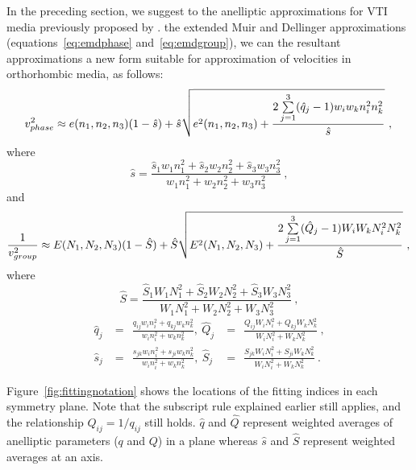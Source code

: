 In the preceding section, we suggest   to the anelliptic approximations for VTI media previously proposed by \cite{fomel}.  the extended Muir and Dellinger approximations (equations~\ref{eq:emdphase} and~\ref{eq:emdgroup}), we can  the resultant approximations  a new form suitable for approximation of velocities in orthorhombic media, as follows:
\begin{equation}
\label{eq:mshphaseortho}
v^2_{phase} \approx e(n_1,n_2,n_3)(1-\hat{s}) + \hat{s}\sqrt{e^2(n_1,n_2, n_3) + \frac{2\sum\limits_{j=1}^3 (\hat{q}_{j}-1)w_iw_kn^2_{i}n^2_{k}}{\hat{s}}}~,\\
\end{equation}
where
\begin{equation}
\hat{s} = \frac{\hat{s}_1w_1n^2_1 + \hat{s}_2w_2n^2_2 + \hat{s}_3w_3n^2_3}{w_1n^2_1 + w_2n^2_2 + w_3n^2_3}~,
\end{equation}
and
\begin{equation}
\label{eq:mshgrouportho}
\frac{1}{v^2_{group}} \approx E(N_1,N_2,N_3)(1-\hat{S}) + \hat{S}\sqrt{E^2(N_1,N_2,N_3) + \frac{2\sum\limits_{j=1}^3(\hat{Q}_{j}-1)W_iW_kN^2_{i}N^2_{k}}{\hat{S}}}~,\\
\end{equation}
where
\begin{equation}
\hat{S} = \frac{\hat{S}_1W_1N^2_1 + \hat{S}_2W_2N^2_2 + \hat{S}_3W_3N^2_3}{W_1N^2_1 + W_2N^2_2 + W_3N^2_3}~,
\end{equation}
\begin{eqnarray}
\label{eq:qi}
\hat{q}_j &= ~~\frac{q_{ij} w_in^2_i + q_{kj} w_kn^2_k}{w_in^2_i + w_kn^2_k},~\hat{Q}_j &=~~ \frac{Q_{ij} W_iN^2_i + Q_{kj} W_kN^2_k}{W_iN^2_i + W_kN^2_k}~, \\
\label{eq:Si}
\hat{s}_j &= ~~\frac{s_{jk} w_in^2_i + s_{ji} w_kn^2_k}{w_in^2_i + w_kn^2_k},~\hat{S}_j &=~~ \frac{S_{jk} W_iN^2_i + S_{ji} W_kN^2_k}{W_iN^2_i + W_kN^2_k}~.
\end{eqnarray}

Figure~\ref{fig:fittingnotation} shows the locations of the fitting indices in each symmetry plane. Note that the subscript rule explained earlier still applies, and the relationship $Q_{ij}=1/q_{ij}$ still holds.  $\hat{q}$ and $\hat{Q}$ represent weighted averages of anelliptic parameters ($q$ and $Q$) in a plane whereas $\hat{s}$ and $\hat{S}$ represent weighted averages at an axis.

